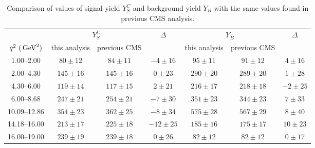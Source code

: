 \begin{table*}[!htb]
  \begin{center}
    \begin{footnotesize}
      \caption{Comparison of values of signal yield $Y^{C}_{S}$ and background yield $Y_{B}$ with the same values found in previous CMS analysis.\label{tab:yieldComp}}
      \begin{tabular}{c|ccc|ccc}
        \hline
        & \multicolumn{2}{c}{$Y^{C}_{S}$} & $\Delta$  & \multicolumn{2}{c}{$Y_{B}$} & $\Delta$ \\
        $q^2~(\,\textrm{GeV}^2)$      & this analysis & previous CMS & & this analysis & previous CMS &\\
        \hline         
        1.00--2.00     & $80  \pm 12$ & $ 84 \pm 11$ & $-4\pm16$  &   $ 95\pm 11$    & $ 91 \pm 12$ & $4  \pm 16$\\
        2.00--4.30     & $145 \pm 16$ & $145 \pm 16$ & $0\pm23$   &   $290\pm 20$    & $289 \pm 20$ & $1  \pm 28$\\
        4.30--6.00     & $119 \pm 14$ & $117 \pm 15$ & $2\pm21$   &   $216\pm 17$    & $218 \pm 18$ & $-2 \pm 25$\\
        6.00--8.68     & $247 \pm 21$ & $254 \pm 21$ & $-7\pm30$  &   $351\pm 23$    & $344 \pm 23$ & $7  \pm 33$\\
        10.09--12.86   & $354 \pm 23$ & $362 \pm 25$ & $-8\pm34$  &   $575\pm 28$    & $567 \pm 29$ & $8  \pm 40$\\
        14.18--16.00   & $213 \pm 17$ & $225 \pm 18$ & $-12\pm25$ &   $185\pm 16$    & $175 \pm 17$ & $10 \pm 23$\\
        16.00--19.00   & $239 \pm 19$ & $239 \pm 18$ & $0\pm26$   &   $ 82\pm 12$    & $ 82 \pm 12$ & $0  \pm 17$\\

        \hline
      \end{tabular}
    \end{footnotesize}
  \end{center}
\end{table*}

